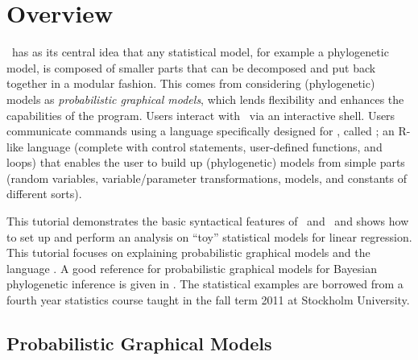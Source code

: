
\section*{Overview}

\RevBayes~has as its central idea that any statistical model, for example a phylogenetic model, is composed of smaller parts that can be decomposed and put back together in a modular fashion. This comes from considering (phylogenetic) models as \textit{probabilistic graphical models}, which lends flexibility and enhances the capabilities of the program. 
Users interact with \RevBayes~via an interactive shell.
Users communicate commands using a language specifically designed for \RevBayes, called \Rev; an R-like language (complete with control statements, user-defined functions, and loops) that enables the user to build up (phylogenetic) models from simple parts (random variables, variable/parameter transformations, models, and constants of different sorts).
 

This tutorial demonstrates the basic syntactical features of \RevBayes~and \Rev~and shows how to set up and perform an analysis on ``toy'' statistical models for linear regression. 
This tutorial focuses on explaining probabilistic graphical models and the language \Rev.
A good reference for probabilistic graphical models for Bayesian phylogenetic inference is given in  \cite{hoehnaGM2014}.
The statistical examples are borrowed from a fourth year statistics course taught in the fall term 2011 at Stockholm University.


\bigskip
\subsection*{Probabilistic Graphical Models}

